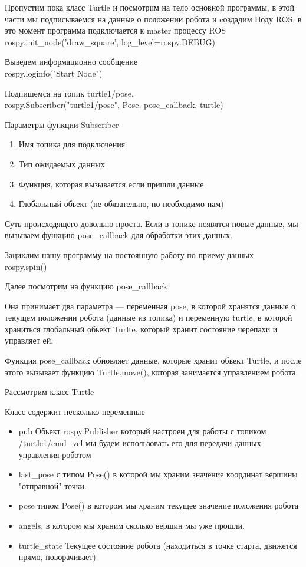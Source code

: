 Пропустим пока класс Turtle и посмотрим на тело основной программы, в этой части мы подписываемся на данные о положении робота и cоздадим Ноду ROS, в это момент программа подключается к master процессу ROS\\
rospy.init\_node('draw\_square', log\_level=rospy.DEBUG)

Выведем информационно сообщение\\
rospy.loginfo("Start Node")

Подпишемся на топик turtle1/pose.\\
rospy.Subscriber("turtle1/pose", Pose, pose\_callback, turtle)

Параметры функции Subscriber
\begin{enumerate}
    \item Имя топика для подключения
    \item Тип ожидаемых данных
    \item Функция, которая вызывается если пришли данные
    \item Глобальный обьект (не обязательно, но необходимо нам)
\end{enumerate}

Суть происходящего довольно проста. Если в топике появятся новые данные, мы вызываем функцию pose\_callback для обработки этих данных.

Зациклим нашу программу на постоянную работу по приему данных\\
rospy.spin()

Далее посмотрим на функцию pose\_callback

Она принимает два параметра — переменная pose, в которой хранятся данные о текущем положении робота (данные из топика) и переменную turtle, в которой храниться глобальный обьект Turlte, который хранит состояние черепахи и управляет ей.

Функция pose\_callback обновляет данные, которые хранит обьект Turtle, и после этого вызывает функцию Turtle.move(), которая занимается управлением робота.

Рассмотрим класс Turtle

Класс содержит несколько переменные
\begin{itemize}
    \item pub Обьект rospy.Publisher который настроен для работы с топиком /turtle1/cmd\_vel мы будем использовать его для передачи данных управления роботом
    \item last\_pose с типом Pose() в которой мы храним значение координат вершины "отправной" точки.
    \item pose типом Pose() в котором мы храним текущее значение положения робота
    \item angels, в котором мы храним сколько вершин мы уже прошли.
    \item turtle\_state Текущее состояние робота (находиться в точке старта, движется прямо, поворачивает)
\end{itemize}

